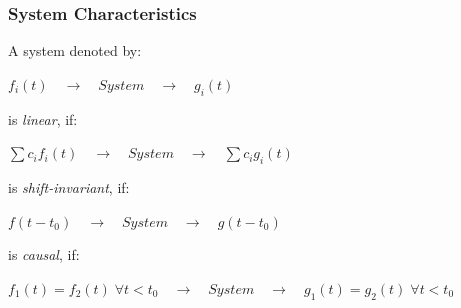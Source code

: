 \begin{frame}
    \frametitle{System Characteristics}

    \begin{myDefinition}
        A system denoted by:
        \begin{center}
            $f_i(t) \quad \rightarrow \quad System \quad \rightarrow \quad g_i(t)$
        \end{center}
        is \textit{linear}, if:
        \begin{center}
            ${\sum c_if_i(t)} \quad \rightarrow \quad System \quad \rightarrow \quad {\sum c_ig_i(t)}$
        \end{center}
        is \textit{shift-invariant}, if:
        \begin{center}
            $f(t-t_0) \quad \rightarrow \quad System \quad \rightarrow \quad g(t-t_0)$
        \end{center}
        is \textit{causal}, if:
        \begin{center}
            $f_1(t) = f_2(t) \; \forall t < t_0 \quad \rightarrow \quad System \quad \rightarrow \quad g_1(t) = g_2(t) \; \forall t < t_0$
        \end{center}
    \end{myDefinition}
\end{frame}


